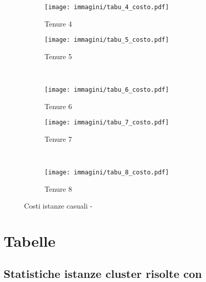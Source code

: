 \begin{figure}[htb]
	\centering
	\begin{subfigure}[b]{.45\textwidth}
		\texttt{[image: immagini/tabu\_4\_costo.pdf]}
		\caption{Tenure 4}
	\end{subfigure}
	\quad
	\begin{subfigure}[b]{.45\textwidth}
		\texttt{[image: immagini/tabu\_5\_costo.pdf]}
		\caption{Tenure 5}
	\end{subfigure}
	\\
	\begin{subfigure}[b]{.45\textwidth}
		\texttt{[image: immagini/tabu\_6\_costo.pdf]}
		\caption{Tenure 6}
	\end{subfigure}
	\quad
	\begin{subfigure}[b]{.45\textwidth}
		\texttt{[image: immagini/tabu\_7\_costo.pdf]}
		\caption{Tenure 7}
	\end{subfigure}
	\\
	\begin{subfigure}[b]{.45\textwidth}
		\texttt{[image: immagini/tabu\_8\_costo.pdf]}
		\caption{Tenure 8}
	\end{subfigure}
	\caption{Costi istanze casuali - \tabu}
	\label{fig:costi tabu}
\end{figure}

\clearpage
\section{Tabelle}
\label{sec:tabelle}

\subsection{Statistiche istanze cluster risolte con }

